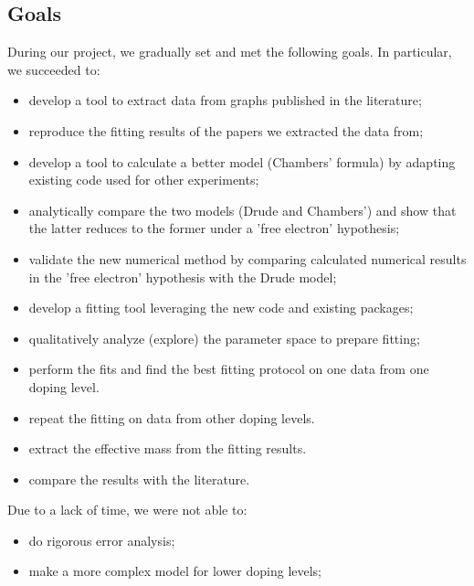 \subsection{Goals}
During our project, we gradually set and met the following goals. In particular, we succeeded to: 
\begin{itemize}
	\item[\done] develop a tool to extract data from graphs published in the literature;
	\item[\done] reproduce the fitting results of the papers we extracted the data from;
	\item[\done] develop a tool to calculate a better model (Chambers' formula) by adapting existing code used for other experiments;
	\item[\done] analytically compare the two models (Drude and Chambers') and show that the latter reduces to the former under a 'free electron' hypothesis;
	\item[\done] validate the new numerical method by comparing calculated numerical results in the 'free electron' hypothesis with the Drude model;
	\item[\done] develop a fitting tool leveraging the new code and existing packages;
	\item[\done] qualitatively analyze (explore) the parameter space to prepare fitting;
	\item[\done] perform the fits and find the best fitting protocol on one data from one doping level.
	\item[\done] repeat the fitting on data from other doping levels.
	\item[\done] extract the effective mass from the fitting results.
	\item[\done] compare the results with the literature.
\end{itemize}
Due to a lack of time, we were not able to:
\begin{itemize}
	\item[\emptybox] do rigorous error analysis;
	\item[\emptybox] make a more complex model for lower doping levels;
\end{itemize}